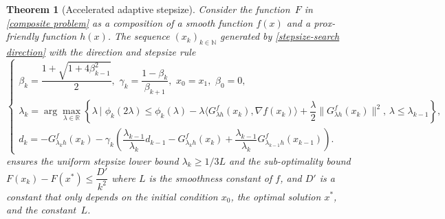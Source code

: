 \documentclass[11pt, a4paper, oneside, reqno]{amsart}
\newtheorem{theorem}{Theorem}[section]
\begin{document}
\begin{theorem}[Accelerated adaptive stepsize]\label{theorem3}
Consider the function~$F$ in \eqref{composite problem} as a composition of a smooth function $f(x)$ and a prox-friendly function $h(x)$. The sequence $\left (x_k \right)_{k \in \mathbb{N}}$ generated by \eqref{stepsize-search direction} with the direction and stepsize rule 
 \begin{equation*}\label{alg:Algorithm2}
\tag{Alg.\,2}
        \begin{cases}
            \beta_k = \dfrac{1+\sqrt{1+4\beta_{k-1}^2}}{2}, \,\, \gamma_k = \dfrac{1-\beta_k}{\beta_{k+1}}, \,\, x_0 = x_1, \,\, \beta_0 = 0,\\
            \lambda_k = \arg\max\limits_{\lambda \in \mathbb{R}} \left\{\lambda \,|\,\, \phi_k(2\lambda) \leq \phi_k(\lambda) - \lambda \langle G^{f}_{\lambda h}(x_k), \nabla f(x_k) \rangle + \dfrac{\lambda}{2}\|G^{f}_{\lambda h}(x_k)\|^2, \, \lambda \leq \lambda_{k-1} \right\},\\
            d_k = -G^{f}_{\lambda_k h}(x_k)-\gamma_k \left(\dfrac{\lambda_{k-1}}{\lambda_k} d_{k-1} - G^{f}_{\lambda_k h}(x_k) + \dfrac{\lambda_{k-1}}{\lambda_k} G^{f}_{\lambda_{k-1} h}(x_{k-1}) \right). 
        \end{cases}
\end{equation*}
ensures the uniform stepsize lower bound $\lambda_k \geq {1}/{3L}$ and the sub-optimality bound $F(x_k) - F(x^*) \leq \dfrac{D'}{k^2}$ where $L$ is the smoothness constant of $f$, and $D'$ is a constant that only depends on the initial condition $x_0$, the optimal solution $x^*$, and the constant~$L$.
\end{theorem}
\end{document}
